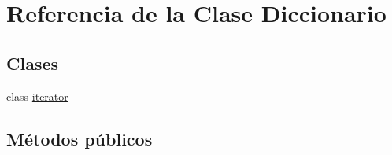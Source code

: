 \hypertarget{classDiccionario}{}\section{Referencia de la Clase Diccionario}
\label{classDiccionario}
\subsection*{Clases}
\begin{DoxyCompactItemize}
\item 
class \hyperlink{classDiccionario_1_1iterator}{iterator}
\end{DoxyCompactItemize}
\subsection*{Métodos públicos}
